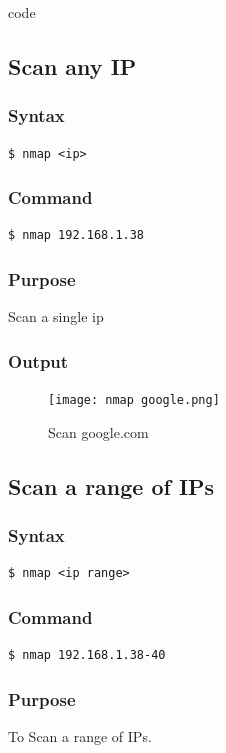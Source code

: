code \documentclass[11pt]{article}
\begin{document}
\subsection{Scan any IP}

\subsubsection{Syntax}
\begin{verbatim}
$ nmap <ip>
\end{verbatim}

\subsubsection*{Command}
\begin{verbatim}
$ nmap 192.168.1.38
\end{verbatim}

\subsubsection*{Purpose}
Scan a single ip

\subsubsection*{Output}
\begin{figure}[H]
    \centering
    \texttt{[image: nmap google.png]}
    \caption{Scan google.com}
    \label{fig:1}
\end{figure}

\subsection{Scan a range of IPs}

\subsubsection{Syntax}
\begin{verbatim}
$ nmap <ip range>
\end{verbatim}

\subsubsection*{Command}
\begin{verbatim}
$ nmap 192.168.1.38-40
\end{verbatim}

\subsubsection*{Purpose}
To Scan a range of IPs.
\end{document}
